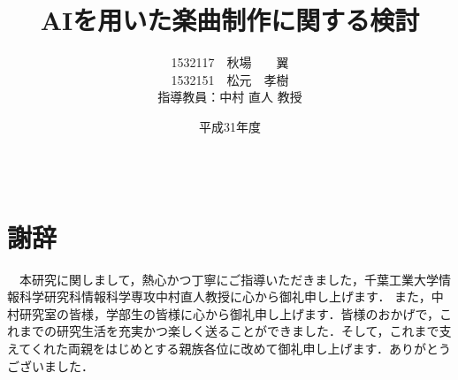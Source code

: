 \documentclass[12pt]{jreport}
\title{AIを用いた楽曲制作に関する検討}					%
\author{1532117　秋場　　翼\\1532151　松元　孝樹\\\normalsize 指導教員：中村 直人 教授}	%
\date{平成31年度}                   %
\begin{document}
\maketitle                        	%
\tableofcontents               	%
\listoffigures				%
\listoftables				%

\baselineskip 20pt              	%

\clearpage
{}



%






\newpage




\chapter*{　\\謝辞}
　本研究に関しまして，熱心かつ丁寧にご指導いただきました，千葉工業大学情報科学研究科情報科学専攻中村直人教授に心から御礼申し上げます．
また，中村研究室の皆様，学部生の皆様に心から御礼申し上げます．皆様のおかげで，これまでの研究生活を充実かつ楽しく送ることができました．そして，これまで支えてくれた両親をはじめとする親族各位に改めて御礼申し上げます．ありがとうございました．
\end{document}
